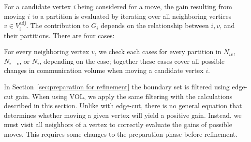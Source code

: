 For a candidate vertex \textit{i} being considered for a move, the gain resulting from moving $i$ to a partition is evaluated by iterating over all neighboring vertices $v \in V^{\mathrm{adj}}_i$. The contribution to $G_i$ depends on the relationship between $i,v$, and their partitions. There are four cases:
For every neighboring vertex $v$, we check each cases for every partition in $N_{iv}$, $N_{i-v}$, or $N_i$, depending on the case; together these cases cover all possible changes in communication volume when moving a candidate vertex $i$. 

In Section~\ref{sec:preparation for refinement} the boundary set is filtered using edge-cut gain. When using VOL, we apply the same filtering with the calculations described in this section. Unlike with edge-cut, there is no general equation that determines whether moving a given vertex will yield a positive gain. Instead, we must visit all neighbors of a vertex to correctly evaluate the gains of possible moves. This requires some changes to the preparation phase before refinement. 

